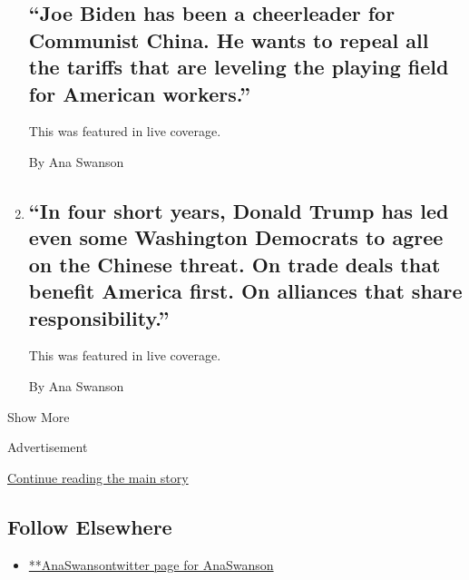 \begin{enumerate}
  \hypertarget{joe-biden-has-been-a-cheerleader-for-communist-china-he-wants-to-repeal-all-the-tariffs-that-are-leveling-the-playing-field-for-american-workers}{%
  \subsection{``Joe Biden has been a cheerleader for Communist China. He
  wants to repeal all the tariffs that are leveling the playing field
  for American
  workers.''}\label{joe-biden-has-been-a-cheerleader-for-communist-china-he-wants-to-repeal-all-the-tariffs-that-are-leveling-the-playing-field-for-american-workers}}

  This was featured in live coverage.

  By Ana Swanson
\item
  \href{/live/2020/08/26/us/rnc-fact-check/in-four-short-years-donald-trump-has-led-even-some-washington-democrats-to-agree-on-the-chinese-threat-on-trade-deals-that-benef}{}

  \hypertarget{in-four-short-years-donald-trump-has-led-even-some-washington-democrats-to-agree-on-the-chinese-threat-on-trade-deals-that-benefit-america-first-on-alliances-that-share-responsibility}{%
  \subsection{``In four short years, Donald Trump has led even some
  Washington Democrats to agree on the Chinese threat. On trade deals
  that benefit America first. On alliances that share
  responsibility.''}\label{in-four-short-years-donald-trump-has-led-even-some-washington-democrats-to-agree-on-the-chinese-threat-on-trade-deals-that-benefit-america-first-on-alliances-that-share-responsibility}}

  This was featured in live coverage.

  By Ana Swanson
\end{enumerate}

Show More

Advertisement

\protect\hyperlink{after-mid2}{Continue reading the main story}

\hypertarget{follow-elsewhere}{%
\subsection{Follow Elsewhere}\label{follow-elsewhere}}

\begin{itemize}
\tightlist
\item
  \href{https://twitter.com/AnaSwanson}{**AnaSwansontwitter page for
  AnaSwanson}
\end{itemize}

